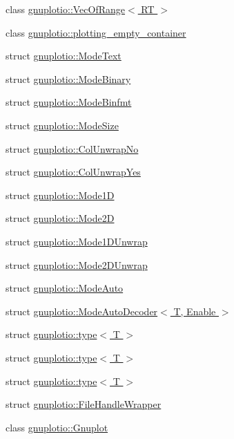 \begin{DoxyCompactItemize}
\item 
class \hyperlink{classgnuplotio_1_1_vec_of_range}{gnuplotio\+::\+Vec\+Of\+Range$<$ R\+T $>$}
\item 
class \hyperlink{classgnuplotio_1_1plotting__empty__container}{gnuplotio\+::plotting\+\_\+empty\+\_\+container}
\item 
struct \hyperlink{structgnuplotio_1_1_mode_text}{gnuplotio\+::\+Mode\+Text}
\item 
struct \hyperlink{structgnuplotio_1_1_mode_binary}{gnuplotio\+::\+Mode\+Binary}
\item 
struct \hyperlink{structgnuplotio_1_1_mode_binfmt}{gnuplotio\+::\+Mode\+Binfmt}
\item 
struct \hyperlink{structgnuplotio_1_1_mode_size}{gnuplotio\+::\+Mode\+Size}
\item 
struct \hyperlink{structgnuplotio_1_1_col_unwrap_no}{gnuplotio\+::\+Col\+Unwrap\+No}
\item 
struct \hyperlink{structgnuplotio_1_1_col_unwrap_yes}{gnuplotio\+::\+Col\+Unwrap\+Yes}
\item 
struct \hyperlink{structgnuplotio_1_1_mode1_d}{gnuplotio\+::\+Mode1D}
\item 
struct \hyperlink{structgnuplotio_1_1_mode2_d}{gnuplotio\+::\+Mode2D}
\item 
struct \hyperlink{structgnuplotio_1_1_mode1_d_unwrap}{gnuplotio\+::\+Mode1\+D\+Unwrap}
\item 
struct \hyperlink{structgnuplotio_1_1_mode2_d_unwrap}{gnuplotio\+::\+Mode2\+D\+Unwrap}
\item 
struct \hyperlink{structgnuplotio_1_1_mode_auto}{gnuplotio\+::\+Mode\+Auto}
\item 
struct \hyperlink{structgnuplotio_1_1_mode_auto_decoder}{gnuplotio\+::\+Mode\+Auto\+Decoder$<$ T, Enable $>$}
\item 
struct \hyperlink{structgnuplotio_1_1_mode_auto_decoder_3_01_t_00_01typename_01boost_1_1enable__if__c_3_01_07_arraea646779afc1e35efaeffcebe81e18a0}{gnuplotio\+::type$<$ T $>$}
\item 
struct \hyperlink{structgnuplotio_1_1_mode_auto_decoder_3_01_t_00_01typename_01boost_1_1enable__if__c_3_01_07_arra33ab7f3325313485a7f29355d9a819fc}{gnuplotio\+::type$<$ T $>$}
\item 
struct \hyperlink{structgnuplotio_1_1_mode_auto_decoder_3_01_t_00_01typename_01boost_1_1enable__if__c_3_01_07_arra8faa7fb46cef74a29a23f22c000e4a99}{gnuplotio\+::type$<$ T $>$}
\item 
struct \hyperlink{structgnuplotio_1_1_file_handle_wrapper}{gnuplotio\+::\+File\+Handle\+Wrapper}
\item 
class \hyperlink{classgnuplotio_1_1_gnuplot}{gnuplotio\+::\+Gnuplot}
\end{DoxyCompactItemize}
